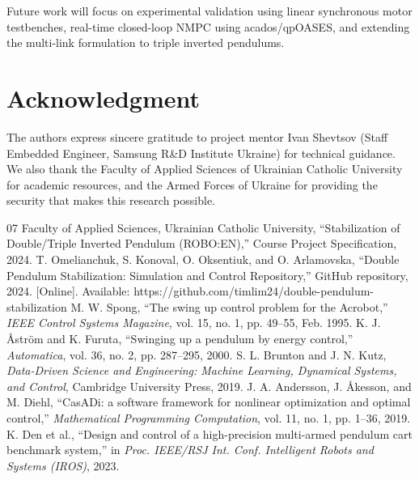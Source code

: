 \documentclass[conference]{IEEEtran}
\begin{document}
Future work will focus on experimental validation using linear synchronous motor testbenches, real-time closed-loop NMPC using acados/qpOASES, and extending the multi-link formulation to triple inverted pendulums.

\section*{Acknowledgment}
The authors express sincere gratitude to project mentor Ivan Shevtsov (Staff Embedded Engineer, Samsung R\&D Institute Ukraine) for technical guidance. We also thank the Faculty of Applied Sciences of Ukrainian Catholic University for academic resources, and the Armed Forces of Ukraine for providing the security that makes this research possible.

\begin{thebibliography}{07}
 Faculty of Applied Sciences, Ukrainian Catholic University, ``Stabilization of Double/Triple Inverted Pendulum (ROBO:EN),'' Course Project Specification, 2024.
 T. Omelianchuk, S. Konoval, O. Oksentiuk, and O. Arlamovska, ``Double Pendulum Stabilization: Simulation and Control Repository,'' GitHub repository, 2024. [Online]. Available: https://github.com/timlim24/double-pendulum-stabilization
 M. W. Spong, ``The swing up control problem for the Acrobot,'' \textit{IEEE Control Systems Magazine}, vol. 15, no. 1, pp. 49--55, Feb. 1995.
 K. J. \r{A}str\"{o}m and K. Furuta, ``Swinging up a pendulum by energy control,'' \textit{Automatica}, vol. 36, no. 2, pp. 287--295, 2000.
 S. L. Brunton and J. N. Kutz, \textit{Data-Driven Science and Engineering: Machine Learning, Dynamical Systems, and Control}, Cambridge University Press, 2019.
 J. A. Andersson, J. \r{A}kesson, and M. Diehl, ``CasADi: a software framework for nonlinear optimization and optimal control,'' \textit{Mathematical Programming Computation}, vol. 11, no. 1, pp. 1--36, 2019.
 K. Den et al., ``Design and control of a high-precision multi-armed pendulum cart benchmark system,'' in \textit{Proc. IEEE/RSJ Int. Conf. Intelligent Robots and Systems (IROS)}, 2023.
\end{thebibliography}
\end{document}
